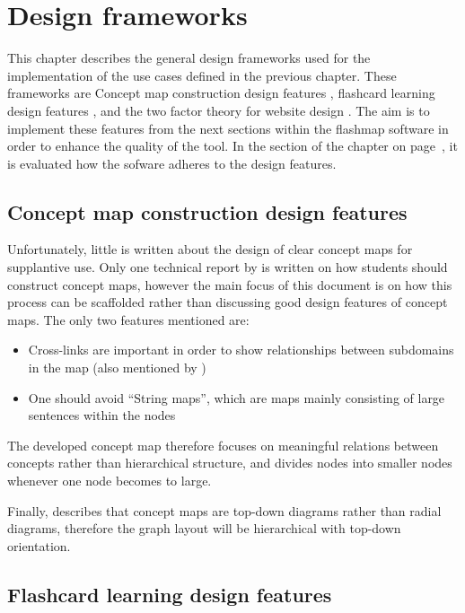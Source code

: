 \chapter{Design frameworks}
\label{ch:frameworks}

This chapter describes the general design frameworks used for the implementation of the use cases defined in the previous chapter. These frameworks are Concept map construction design features \cite{constructcmaps}, flashcard learning design features \cite{nakata}, and the two factor theory for website design \cite{websitedesign}. The aim is to implement these features from the next sections within the flashmap software in order to enhance the quality of the tool. In the  section of the  chapter on page~\pageref{sec:screening}, it is evaluated how the sofware adheres to the design features.

    \section{Concept map construction design features}
    \label{sec:cmapframework}

Unfortunately, little is written about the design of clear concept maps for supplantive use. Only one technical report by \cite{constructcmaps} is written on how students should construct concept maps, however the main focus of this document is on how this process can be scaffolded rather than discussing good design features of concept maps. The only two features mentioned are:

\begin{itemize}
    \item Cross-links are important in order to show relationships between subdomains in the map (also mentioned by )
    \item One should avoid ``String maps'', which are maps mainly consisting of large sentences within the nodes
\end{itemize}

The developed concept map therefore focuses on meaningful relations between concepts rather than hierarchical structure, and divides nodes into smaller nodes whenever one node becomes to large.

Finally,  describes that concept maps are top-down diagrams rather than radial diagrams, therefore the graph layout will be hierarchical with top-down orientation.

    \section{Flashcard learning design features}


